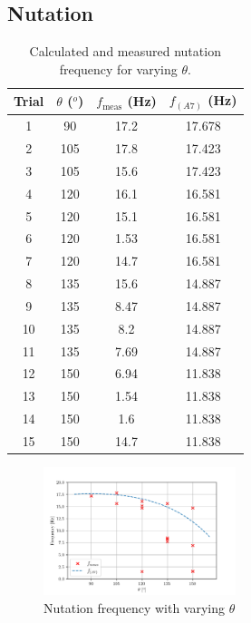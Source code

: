 \documentclass[8pt]{article}
\begin{document}
\subsection{Nutation}

\begin{table}[H]
    \centering
    \begin{tabular}{|c|c|c|c|}
        \hline
        Trial & $\theta$ ($^o$) & $f_{\text{meas}}$ (Hz) & $f_{(A7)}$ (Hz) \\
        \hline
        1	& 90   &	17.2    & 	17.678 \\
        2	& 105  &	17.8    & 	17.423 \\
        3	& 105  &	15.6    & 	17.423 \\
        4	& 120  &	16.1    & 	16.581 \\
        5	& 120  &	15.1    & 	16.581 \\
        6	& 120  &	1.53    & 	16.581 \\
        7	& 120  &	14.7    & 	16.581 \\
        8	& 135  &	15.6    & 	14.887 \\
        9	& 135  &	8.47    & 	14.887 \\
        10	& 135  &	8.2	    &   14.887 \\
        11	& 135  &	7.69    & 	14.887 \\
        12	& 150  &	6.94    & 	11.838 \\
        13	& 150  &	1.54    & 	11.838 \\
        14	& 150  &	1.6	    &   11.838 \\
        15	& 150  &	14.7    & 	11.838 \\
        \hline
    \end{tabular}
    \caption{Calculated and measured nutation frequency for varying $\theta$.}
    \label{tab:nutation}
\end{table}

\begin{figure}[H]
    \centering
    \includegraphics[width=0.5\textwidth]{nutation.png}
    \caption{Nutation frequency with varying $\theta$}
    \label{fig:nutation}
\end{figure}
\end{document}
